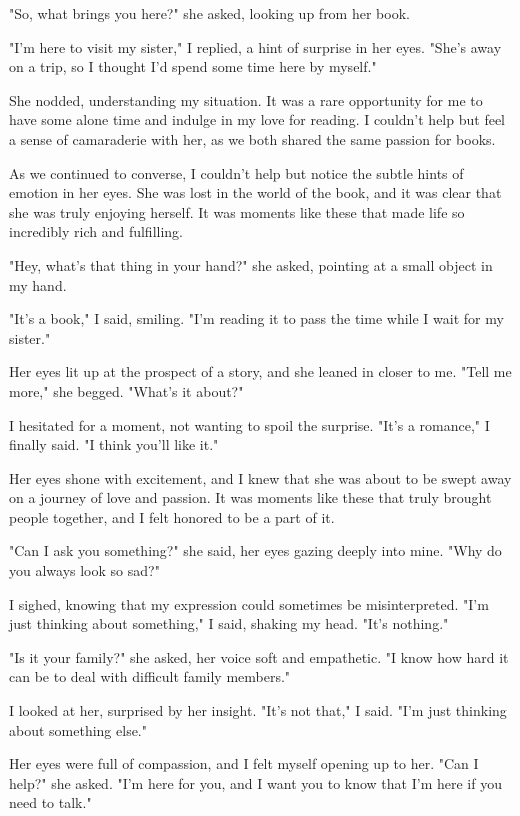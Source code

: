 \documentclass[smalldemyvopaper,11pt,twoside,onecolumn,openright,extrafontsizes]{memoir}
\begin{document}
"So, what brings you here?" she asked, looking up from her book.\par
"I'm here to visit my sister," I replied, a hint of surprise in her eyes. "She's away on a trip, so I thought I'd spend some time here by myself."\par
She nodded, understanding my situation. It was a rare opportunity for me to have some alone time and indulge in my love for reading. I couldn't help but feel a sense of camaraderie with her, as we both shared the same passion for books.\par
As we continued to converse, I couldn't help but notice the subtle hints of emotion in her eyes. She was lost in the world of the book, and it was clear that she was truly enjoying herself. It was moments like these that made life so incredibly rich and fulfilling.\par
"Hey, what's that thing in your hand?" she asked, pointing at a small object in my hand.\par
"It's a book," I said, smiling. "I'm reading it to pass the time while I wait for my sister."\par
Her eyes lit up at the prospect of a story, and she leaned in closer to me. "Tell me more," she begged. "What's it about?"\par
I hesitated for a moment, not wanting to spoil the surprise. "It's a romance," I finally said. "I think you'll like it."\par
Her eyes shone with excitement, and I knew that she was about to be swept away on a journey of love and passion. It was moments like these that truly brought people together, and I felt honored to be a part of it.\par
"Can I ask you something?" she said, her eyes gazing deeply into mine. "Why do you always look so sad?"\par
I sighed, knowing that my expression could sometimes be misinterpreted. "I'm just thinking about something," I said, shaking my head. "It's nothing."\par
"Is it your family?" she asked, her voice soft and empathetic. "I know how hard it can be to deal with difficult family members."\par
I looked at her, surprised by her insight. "It's not that," I said. "I'm just thinking about something else."\par
Her eyes were full of compassion, and I felt myself opening up to her. "Can I help?" she asked. "I'm here for you, and I want you to know that I'm here if you need to talk."\par
\end{document}
